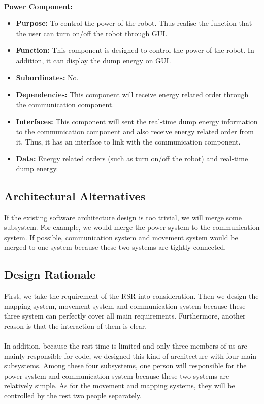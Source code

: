\documentclass[11pt, a4paper]{article}
\begin{document}
\\
\textbf{Power Component:}
\begin{itemize}
\item {\bfseries Purpose: }To control the power of the robot. Thus realise the function that the user can turn on/off the robot through GUI.
\item {\bfseries Function: }This component is designed to control the power of the robot. In addition, it can display the dump energy on GUI.
\item {\bfseries Subordinates: }No.
\item {\bfseries Dependencies: }This component will receive energy related order through the communication component. 
\item {\bfseries Interfaces: }This component will sent the real-time dump energy information to the communication component and also receive energy related order from it. Thus, it has an interface to link with the communication component.
\item {\bfseries Data: }Energy related orders (such as turn on/off the robot) and real-time dump energy.\end{itemize}

\subsection{Architectural Alternatives}
If the existing software architecture design is too trivial, we will merge some subsystem. For example, we would merge the power system to the communication system. If possible, communication system and movement system would be merged to one system because these two systems are tightly connected. 

\subsection{Design Rationale}
First, we take the requirement of the RSR into consideration. Then we design the mapping system, movement system and communication system because these three system can perfectly cover all main requirements. Furthermore, another reason is that the interaction of them is clear. \\ 
\\
In addition, because the rest time is limited and only three members of us are mainly responsible for code, we designed this kind of architecture with four main subsystems. Among these four subsystems, one person will responsible for the power system and communication system because these two systems are relatively simple. As for the movement and mapping systems, they will be controlled by the rest two people separately. 
\newpage
\end{document}
